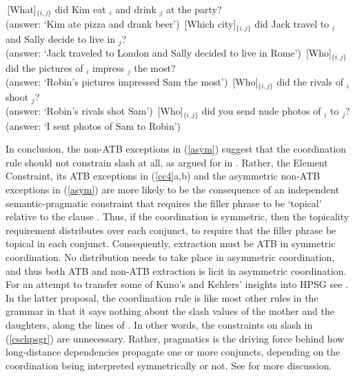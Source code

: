\documentclass[output=paper
 	        ,biblatex
                ,babelshorthands
                ,newtxmath
                ,draftmode
                ,colorlinks, citecolor=brown
]{langscibook}
\begin{document}
\eal \label{cumulative}
\ex
\,[What]$_{\lbrace i,j \rbrace}$ did Kim eat \spc$_i$ and drink \spc$_j$ at the party?\\
(answer: `Kim ate pizza and drank beer')
\ex \,[Which city]$_{\lbrace i,j \rbrace}$ did Jack travel to \spc$_i$ and Sally decide to live in \spc$_j$?\\
(answer: `Jack traveled to London and Sally decided to live in Rome')
\ex \,[Who]$_{\lbrace i,j \rbrace}$ did the pictures of \spc$_i$ impress \spc$_j$ the most?\\
(answer: `Robin's pictures impressed Sam the most')
\ex \,[Who]$_{\lbrace i,j \rbrace}$ did the rivals of \spc$_i$ shoot \spc$_j$?\\
(answer: `Robin's rivals shot Sam')
\ex \,[Who]$_{\lbrace i,j \rbrace}$ did you send nude photos of \spc$_i$ to \spc$_j$?\\
(answer: `I sent photos of Sam to Robin')
\zl


In conclusion, the  non-ATB exceptions in (\ref{asym}) suggest that the coordination rule should not constrain {\sc slash} at all, as argued for in \citet{chaves}.  Rather,  the Element Constraint, its ATB exceptions in (\ref{cc4}a,b) and the asymmetric non-ATB exceptions in (\ref{asym}) are more likely to be the consequence of an independent semantic-pragmatic constraint that requires the filler phrase to be `topical'  relative to the clause \citep{lakoff86,kuno87,kehler,kubotalee}. Thus, if the coordination is  symmetric, then the topicality requirement  distributes over each conjunct, to require that the  filler phrase be topical in each conjunct. Consequently, extraction must
be ATB in symmetric coordination. No distribution needs to take place in asymmetric coordination, and thus both 
ATB and non-ATB extraction is licit in asymmetric coordination. For an attempt to transfer
some of Kuno's and Kehlers' insights into HPSG  see \citet{chaves}. In the latter proposal,
 the coordination rule is like most other rules in the grammar in that it says nothing about
the {\sc slash} values of the mother and the daughters, along the lines of 
\citet[354]{levhubook}. In other words, the constraints on {\sc slash} in (\ref{cschpsgr}) are unnecessary.  Rather, pragmatics is the driving force behind how  long-distance dependencies propagate one or more conjuncts, depending on the coordination being interpreted symmetrically or not. 
See  for more discussion.
\end{document}
